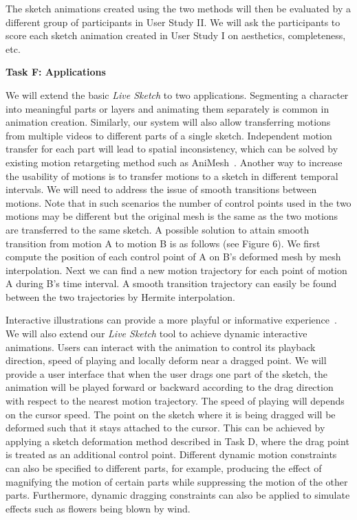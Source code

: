 {The sketch animations created using the two methods will then be evaluated by a different group of participants in User Study II.
We will ask the participants to score each sketch animation created in User Study I on aesthetics, completeness, etc. 


\textbf{Task F: Applications}

We will extend the basic \textit{Live Sketch} to two applications.
	Segmenting a character into meaningful parts or layers and animating them separately is common in animation creation. Similarly, our system will also allow transferring motions from multiple videos to different parts of a single sketch. Independent motion transfer for each part will lead to spatial inconsistency, which can be solved by existing motion retargeting method such as AniMesh~\cite{Jin:2015}.
	Another way to increase the usability of motions is to transfer motions to a sketch in different temporal intervals.  We will need to address the issue of smooth transitions between motions.
Note that in such scenarios the number of control points used in the two motions may be different but the original mesh is the same as
the two motions are transferred to the same sketch. 
A possible solution to attain smooth transition from motion A to motion B is as follows (see Figure 6). We first compute the position of each control point of A on B's deformed mesh by mesh interpolation. Next we can find a new motion trajectory for each point of motion A during B's time interval. A smooth transition trajectory can easily be found between the two trajectories by Hermite 
interpolation.
	
	Interactive illustrations can provide a more playful or informative experience~\cite{Kazi:2014b}. We will also extend our \textit{Live Sketch} tool to achieve dynamic interactive animations. Users can interact with the animation to control its playback direction, speed of playing and locally deform near a dragged point. 
	We will provide a user interface that when the user drags one part of the sketch, the animation will be played forward or backward according to the drag direction with respect to the nearest motion trajectory. The speed of playing will depends on the cursor speed.  The point on the sketch where it is being dragged will be deformed such that it stays attached to the cursor. This can be achieved by applying a sketch deformation method described in Task D, where the drag point is treated as an additional control point.
	Different dynamic motion constraints can also be specified to different parts, for example, producing the effect of magnifying the motion of certain parts while suppressing the motion of the other parts. 
Furthermore, dynamic dragging constraints can also be applied to simulate effects such as flowers being blown by wind.  

}
